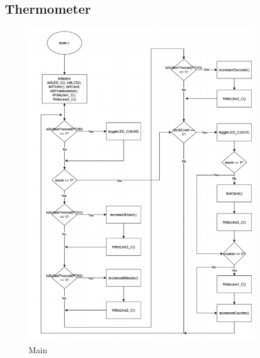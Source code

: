 \documentclass[a4paper,12pt]{article}
\begin{document}
\subsection{Thermometer}
\begin{figure}[H]
    \centering
    \includegraphics[width=0.9\textwidth]{diagrams/main(2).png}
    \caption{Main}
    \label{fig:Main}
\end{figure}

\newpage
\end{document}
